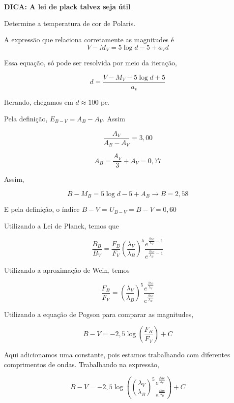 \documentclass[11pt]{article}
\begin{document}
\begin{pproblem}
\begin{alternativas}
    \textbf{DICA: A lei de plack talvez seja útil}
    \item Determine a temperatura de cor de Polaris.
\end{alternativas}
\begin{pssolution*}{}{}
    \begin{alternativas}
        \item A expressão que relaciona corretamente as magnitudes é 
        \[V - M_V = 5 \log d - 5 + a_V d\]

        Essa equação, só pode ser resolvida por meio da iteração,

        \[d = \frac{V-M_V - 5\log d + 5}{a_v}\]

        Iterando, chegamos em \(\boxed{d\approx 100\text{ pc}}\).

        \item Pela definição, \(E_{B-V} = A_B - A_V\). Assim
        
        \[\frac{A_V}{A_B-A_V} = 3,00\]

        \[A_B = \frac{A_V}{3}+A_V = 0,77\]

        Assim, 

        \[B-M_B = 5\log d - 5 + A_B\rightarrow B = 2,58\]

        E pela definição, o índice \(B-V\) = \(\boxed{U_{B-V} = B-V = 0,60}\)

        \item Utilizando a Lei de Planck, temos que 
        
        \[\frac{B_B}{B_V} = \frac{F_B}{F_V} \left(\frac{\lambda_V}{\lambda_B}\right)^5 \frac{e^{\frac{\beta hc}{\lambda_V}-1}}{e^{\frac{\beta hc}{\lambda_B}-1}}\]

        Utilizando a aproximação de Wein, temos

        \[\frac{F_B}{F_V} = \left(\frac{\lambda_V}{\lambda_B}\right)^5 \frac{e^{\frac{\beta hc}{\lambda_V}}}{e^{\frac{\beta hc}{\lambda_B}}}\]

        Utilizando a equação de Pogson para comparar as magnitudes, 

        \[B-V = -2,5\log\left(\frac{F_B}{F_V}\right)+C\]

        Aqui adicionamos uma constante, pois estamos trabalhando com diferentes comprimentos de ondas. Trabalhando na expressão, 

        \[B-V = -2,5\log\left(\left(\frac{\lambda_V}{\lambda_B}\right)^5 \frac{e^{\frac{\beta hc}{\lambda_V}}}{e^{\frac{\beta hc}{\lambda_B}}}\right)+C\]


\end{alternativas}
\end{pssolution*}
\end{pproblem}
\end{document}
